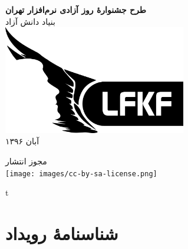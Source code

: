\documentclass{article}
\begin{document}
\itemsep5mm \parskip2pt 

\thispagestyle{empty}

\vspace*{2cm}
\begin{center}
{\huge
\textbf{
طرح جشنوارهٔ روز آزادی نرم‌افزار تهران
}
\\[1cm]}
{\Large
بنیاد دانش آزاد
}
{\large
\\[1cm]
\baselineskip=1cm
\includegraphics[width=8cm]{images/logo.png}
\\[.4cm]
آبان ۱۳۹۶
\\[.4cm]

}


{\large
مجوز انتشار
\\[.4cm]

\Large
\texttt{[image: images/cc-by-sa-license.png]}

}

\end{center}


\newpage
\thispagestyle{empty}
\vspace*{\fill}
\begin{center}
\Bes
\Huge
t
\end{center}
\vspace*{\fill}


\newpage
\thispagestyle{empty}
\tableofcontents %




\newpage
\vspace*{2cm}

\section{شناسنامهٔ رویداد}
\end{document}
